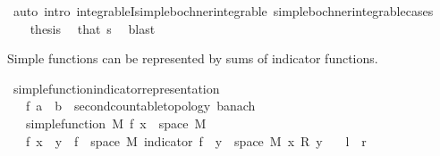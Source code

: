 \begin{isabellebody}
\ {\isacharparenleft}{\kern0pt}auto\ intro{\isacharcolon}{\kern0pt}\ integrableI{\isacharunderscore}{\kern0pt}simple{\isacharunderscore}{\kern0pt}bochner{\isacharunderscore}{\kern0pt}integrable\ simple{\isacharunderscore}{\kern0pt}bochner{\isacharunderscore}{\kern0pt}integrable{\isachardot}{\kern0pt}cases{\isacharparenright}{\kern0pt}\isanewline
\ \ \isacommand{{\isacharbraceright}{\kern0pt}}\isamarkupfalse%
\isanewline
\ \ \isamarkupfalse%
\ {\isacharquery}{\kern0pt}thesis\ \isamarkupfalse%
\ that\ s\ \isamarkupfalse%
\ blast\isanewline
{}\isamarkupfalse%
%
\endisatagproof
{\isafoldproof}%
%
\isadelimproof
%
\endisadelimproof
%
\begin{isamarkuptext}%
Simple functions can be represented by sums of indicator functions.%
\end{isamarkuptext}\isamarkuptrue%
\isamarkupfalse%
\ simple{\isacharunderscore}{\kern0pt}function{\isacharunderscore}{\kern0pt}indicator{\isacharunderscore}{\kern0pt}representation{\isacharcolon}{\kern0pt}\isanewline
\ \ \ f\ {\isacharcolon}{\kern0pt}{\isacharcolon}{\kern0pt}{\isachardoublequoteopen}{\isacharprime}{\kern0pt}a\ {\isasymRightarrow}\ {\isacharprime}{\kern0pt}b\ {\isacharcolon}{\kern0pt}{\isacharcolon}{\kern0pt}\ {\isacharbraceleft}{\kern0pt}second{\isacharunderscore}{\kern0pt}countable{\isacharunderscore}{\kern0pt}topology{\isacharcomma}{\kern0pt}\ banach{\isacharbraceright}{\kern0pt}{\isachardoublequoteclose}\isanewline
\ \ \ {\isachardoublequoteopen}simple{\isacharunderscore}{\kern0pt}function\ M\ f{\isachardoublequoteclose}\ {\isachardoublequoteopen}x\ {\isasymin}\ space\ M{\isachardoublequoteclose}\isanewline
\ \ \ {\isachardoublequoteopen}f\ x\ {\isacharequal}{\kern0pt}\ {\isacharparenleft}{\kern0pt}{\isasymSum}y\ {\isasymin}\ f\ {\isacharbackquote}{\kern0pt}\ space\ M{\isachardot}{\kern0pt}\ indicator\ {\isacharparenleft}{\kern0pt}f\ {\isacharminus}{\kern0pt}{\isacharbackquote}{\kern0pt}\ {\isacharbraceleft}{\kern0pt}y{\isacharbraceright}{\kern0pt}\ {\isasyminter}\ space\ M{\isacharparenright}{\kern0pt}\ x\ {\isacharasterisk}{\kern0pt}\isactrlsub R\ y{\isacharparenright}{\kern0pt}{\isachardoublequoteclose}\isanewline
\ \ {\isacharparenleft}{\kern0pt}\ {\isachardoublequoteopen}{\isacharquery}{\kern0pt}l\ {\isacharequal}{\kern0pt}\ {\isacharquery}{\kern0pt}r{\isachardoublequoteclose}{\isacharparenright}{\kern0pt}\isanewline
%
\isadelimproof
%
\endisadelimproof
%
\isatagproof
{}\isamarkupfalse%

\end{isabellebody}
